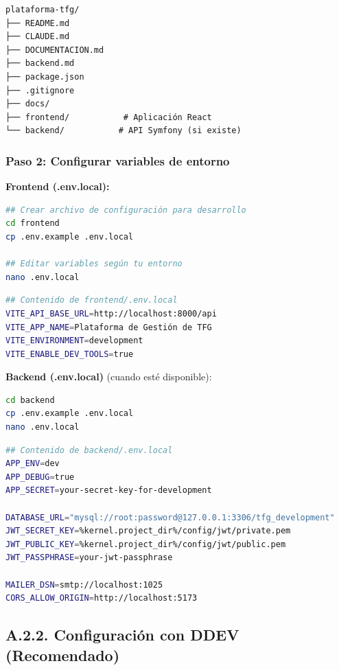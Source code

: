 \documentclass[12pt,a4paper,oneside]{report}
\begin{document}
{\begin{lstlisting}
plataforma-tfg/
├── README.md
├── CLAUDE.md
├── DOCUMENTACION.md
├── backend.md
├── package.json
├── .gitignore
├── docs/
├── frontend/           # Aplicación React
└── backend/           # API Symfony (si existe)
\end{lstlisting}

\subsubsection{Paso 2: Configurar variables de
entorno}\label{paso-2-configurar-variables-de-entorno}

\textbf{Frontend (.env.local):}

\begin{lstlisting}[language=bash]
## Crear archivo de configuración para desarrollo
cd frontend
cp .env.example .env.local

## Editar variables según tu entorno
nano .env.local
\end{lstlisting}

\begin{lstlisting}[language=bash]
## Contenido de frontend/.env.local
VITE_API_BASE_URL=http://localhost:8000/api
VITE_APP_NAME=Plataforma de Gestión de TFG
VITE_ENVIRONMENT=development
VITE_ENABLE_DEV_TOOLS=true
\end{lstlisting}

\textbf{Backend (.env.local)} (cuando esté disponible):

\begin{lstlisting}[language=bash]
cd backend
cp .env.example .env.local
nano .env.local
\end{lstlisting}

\begin{lstlisting}[language=bash]
## Contenido de backend/.env.local
APP_ENV=dev
APP_DEBUG=true
APP_SECRET=your-secret-key-for-development

DATABASE_URL="mysql://root:password@127.0.0.1:3306/tfg_development"
JWT_SECRET_KEY=%kernel.project_dir%/config/jwt/private.pem
JWT_PUBLIC_KEY=%kernel.project_dir%/config/jwt/public.pem
JWT_PASSPHRASE=your-jwt-passphrase

MAILER_DSN=smtp://localhost:1025
CORS_ALLOW_ORIGIN=http://localhost:5173
\end{lstlisting}

\subsection{A.2.2. Configuración con DDEV
(Recomendado)}\label{a.2.2.-configuraciuxf3n-con-ddev-recomendado}

}
\end{document}
